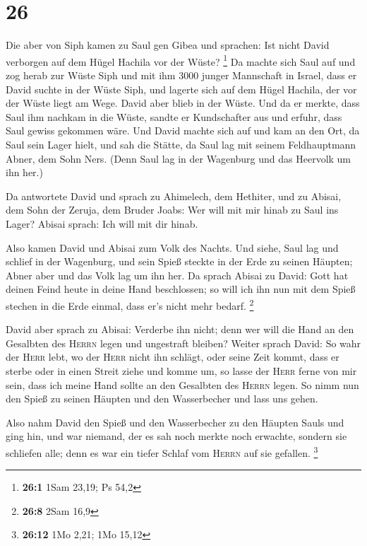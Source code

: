 \hypertarget{section-25}{%
\section{26}\label{section-25}}

 Die aber von Siph kamen zu Saul gen Gibea und sprachen:
Ist nicht David verborgen auf dem Hügel Hachila vor der Wüste?
\footnote{\textbf{26:1} 1Sam 23,19; Ps 54,2}  Da machte
sich Saul auf und zog herab zur Wüste Siph und mit ihm 3000 junger
Mannschaft in Israel, dass er David suchte in der Wüste Siph,
 und lagerte sich auf dem Hügel Hachila, der vor der Wüste
liegt am Wege. David aber blieb in der Wüste. Und da er merkte, dass
Saul ihm nachkam in die Wüste,  sandte er Kundschafter aus
und erfuhr, dass Saul gewiss gekommen wäre.  Und David
machte sich auf und kam an den Ort, da Saul sein Lager hielt, und sah
die Stätte, da Saul lag mit seinem Feldhauptmann Abner, dem Sohn Ners.
(Denn Saul lag in der Wagenburg und das Heervolk um ihn her.)

 Da antwortete David und sprach zu Ahimelech, dem
Hethiter, und zu Abisai, dem Sohn der Zeruja, dem Bruder Joabs: Wer will
mit mir hinab zu Saul ins Lager? Abisai sprach: Ich will mit dir hinab.

 Also kamen David und Abisai zum Volk des Nachts. Und
siehe, Saul lag und schlief in der Wagenburg, und sein Spieß steckte in
der Erde zu seinen Häupten; Abner aber und das Volk lag um ihn her.
 Da sprach Abisai zu David: Gott hat deinen Feind heute in
deine Hand beschlossen; so will ich ihn nun mit dem Spieß stechen in die
Erde einmal, dass er's nicht mehr bedarf. \footnote{\textbf{26:8} 2Sam
  16,9}

 David aber sprach zu Abisai: Verderbe ihn nicht; denn wer
will die Hand an den Gesalbten des \textsc{Herrn} legen und ungestraft
bleiben?  Weiter sprach David: So wahr der \textsc{Herr}
lebt, wo der \textsc{Herr} nicht ihn schlägt, oder seine Zeit kommt,
dass er sterbe oder in einen Streit ziehe und komme um, 
so lasse der \textsc{Herr} ferne von mir sein, dass ich meine Hand
sollte an den Gesalbten des \textsc{Herrn} legen. So nimm nun den Spieß
zu seinen Häupten und den Wasserbecher und lass uns gehen.

 Also nahm David den Spieß und den Wasserbecher zu den
Häupten Sauls und ging hin, und war niemand, der es sah noch merkte noch
erwachte, sondern sie schliefen alle; denn es war ein tiefer Schlaf vom
\textsc{Herrn} auf sie gefallen. \footnote{\textbf{26:12} 1Mo 2,21; 1Mo
  15,12}

